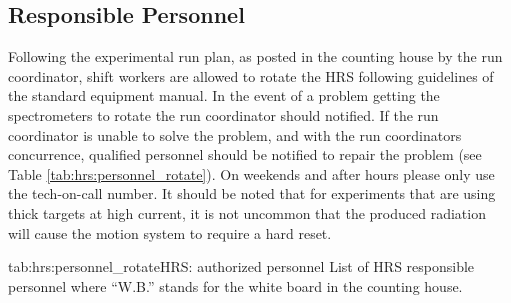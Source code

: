 \begin{safetyen}{0}{0}
\subsection{Responsible Personnel}

Following the experimental run plan, as posted in the counting house by the run coordinator,
shift workers are allowed to rotate the HRS following guidelines of the standard equipment manual.
In the event of a problem getting the spectrometers to rotate the run coordinator should notified.
If the run coordinator is unable to solve the problem, and with the run coordinators concurrence, 
qualified personnel should be notified to repair the problem (see Table \ref{tab:hrs:personnel_rotate}).  
On weekends and after hours please only use the tech-on-call number.
It should be noted that for experiments that are using thick targets at high current, it is
not uncommon that the produced radiation will cause the motion system to require a hard reset.

\begin{namestab}{tab:hrs:personnel_rotate}{HRS: authorized personnel}{%
      List of HRS responsible personnel where ``W.B.'' stands for the white board 
      in the counting house.}
   \EllenBecker{}
   \HeidiFansler{}
   \ZakRemele{}
   \AndrewLumanog{}
\end{namestab}

\end{safetyen}

